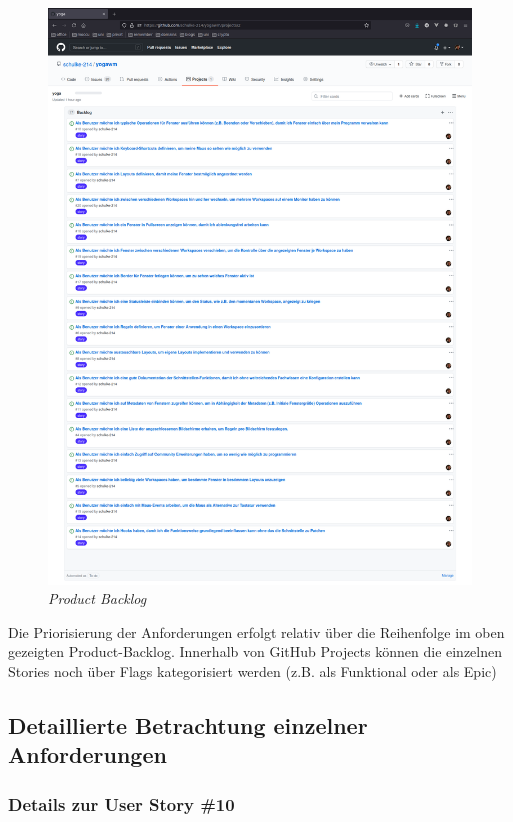 \documentclass{article}
\begin{document}
\begin{figure}[ht]
	\includegraphics[width=1\textwidth]{product-backlog}
	\centering
	\caption{\emph{Product Backlog}}
	\label{fig:backlog}
\end{figure}

\vspace{1em}

Die Priorisierung der Anforderungen erfolgt relativ über die Reihenfolge im oben gezeigten Product-Backlog.
Innerhalb von GitHub Projects können die einzelnen Stories noch über Flags kategorisiert werden (z.B. als
Funktional oder als Epic)

\subsection{Detaillierte Betrachtung einzelner Anforderungen}

\subsubsection{Details zur User Story \#10}
\end{document}
